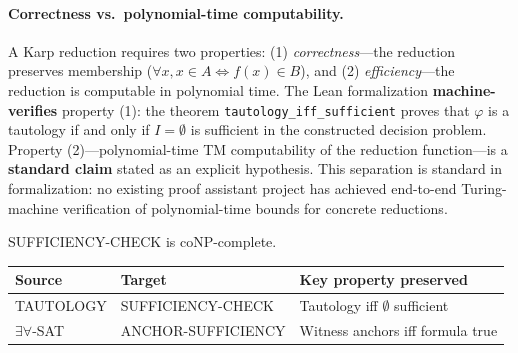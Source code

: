 \paragraph{Correctness vs.\ polynomial-time computability.}
A Karp reduction requires two properties: (1) \emph{correctness}---the reduction preserves membership ($\forall x, x \in A \Leftrightarrow f(x) \in B$), and (2) \emph{efficiency}---the reduction is computable in polynomial time. The Lean formalization \textbf{machine-verifies} property (1): the theorem \texttt{tautology\_iff\_sufficient} proves that $\varphi$ is a tautology if and only if $I = \emptyset$ is sufficient in the constructed decision problem. Property (2)---polynomial-time TM computability of the reduction function---is a \textbf{standard claim} stated as an explicit hypothesis. This separation is standard in formalization: no existing proof assistant project has achieved end-to-end Turing-machine verification of polynomial-time bounds for concrete reductions.

\begin{theorem}
\label{thm:sufficiency-conp}
SUFFICIENCY-CHECK is coNP-complete.
\end{theorem}

\begin{center}
\begin{tabular}{lll}
\toprule
Source & Target & Key property preserved \\
\midrule
TAUTOLOGY & SUFFICIENCY-CHECK & Tautology iff $\emptyset$ sufficient \\
$\exists\forall$-SAT & ANCHOR-SUFFICIENCY & Witness anchors iff formula true \\
\bottomrule
\end{tabular}
\end{center}

